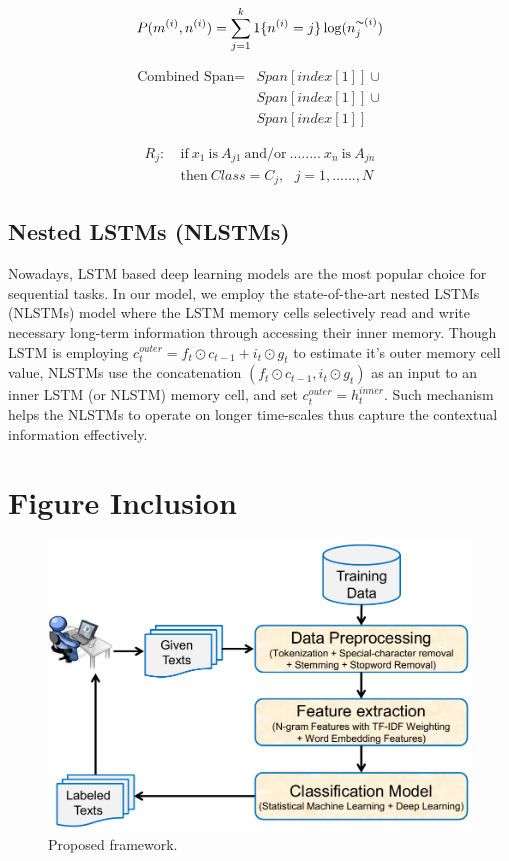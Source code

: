 \documentclass[11pt]{article}
\begin{document}
\begin{equation*}
P(m^{(i)},n^{(i)}) = \sum^{k}_{j=1} 1\{n^{(i)}=j\} \log(n_{j}^{\thicksim(i)})
\end{equation*}


\begin{equation*}
\begin{split}
\mbox{Combined Span} = &Span[index[1]] \cup \\  
                       &Span[index[1]] \cup \\
                       &Span[index[1]]
\end{split}
\end{equation*}


\begin{equation*}
\begin{split}
R_j: & \ \mbox{if}\ x_1\ \mbox{is}\ A_{j1}\ \mbox{and/or}\ ........\ x_n\ \mbox{is}\ A_{jn}\\
	 & \ \mbox{then}\ Class=C_j, \ \ \ j=1,......,N
\end{split}
\end{equation*}


\subsection{Nested LSTMs (NLSTMs)}
\label{ref:nestedLSTMs}
Nowadays, LSTM based deep learning models are the most popular choice for sequential tasks. In our model, we employ the state-of-the-art nested LSTMs (NLSTMs) model where the LSTM memory cells selectively read and write necessary long-term information through accessing their inner memory. Though LSTM is employing $c_{t}^{outer}={f_{t}}\odot{c_{t-1}}+{i_{t}}\odot{g_{t}}$ to estimate it's outer memory cell value, NLSTMs use the concatenation $({f_{t}}\odot{c_{t-1}},{i_{t}}\odot{g_{t}})$ as an input to an inner LSTM (or NLSTM) memory cell, and set $c_{t}^{outer}=h_{t}^{inner}$. Such mechanism helps the NLSTMs to operate on longer time-scales thus capture the contextual information effectively.


\section{Figure Inclusion}
\label{ref:figure}

\begin{figure}[!htb]
\centering
\includegraphics[width=0.65\linewidth]{overview.pdf}
\caption{Proposed framework.}
\label{fig:overview}
\end{figure}
\end{document}
